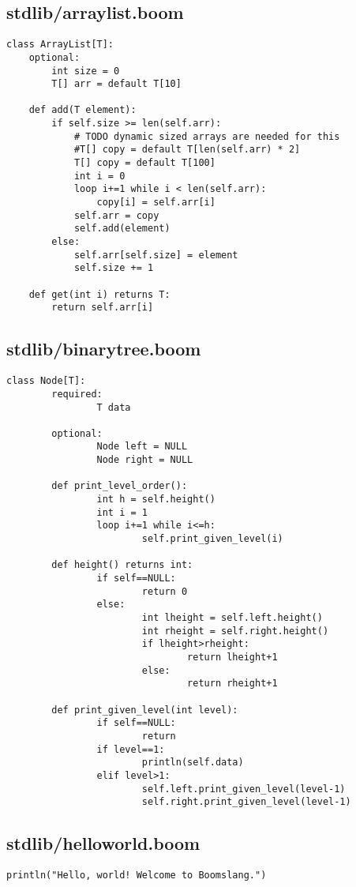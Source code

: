\documentclass{article}
\begin{document}
\subsection{stdlib/arraylist.boom} 
\begin{verbatim}
class ArrayList[T]:
	optional:
		int size = 0
		T[] arr = default T[10]

	def add(T element):
		if self.size >= len(self.arr):
			# TODO dynamic sized arrays are needed for this
			#T[] copy = default T[len(self.arr) * 2]
			T[] copy = default T[100]
			int i = 0
			loop i+=1 while i < len(self.arr):
				copy[i] = self.arr[i]
			self.arr = copy
			self.add(element)
		else:
			self.arr[self.size] = element
			self.size += 1

	def get(int i) returns T:
		return self.arr[i]
\end{verbatim}




\subsection{stdlib/binarytree.boom} 
\begin{verbatim}
class Node[T]:
        required:
                T data

        optional:
                Node left = NULL
                Node right = NULL

        def print_level_order():
                int h = self.height()
                int i = 1
                loop i+=1 while i<=h:
                        self.print_given_level(i)

        def height() returns int:
                if self==NULL:
                        return 0
                else:
                        int lheight = self.left.height()
                        int rheight = self.right.height()
                        if lheight>rheight:
                                return lheight+1
                        else:
                                return rheight+1

        def print_given_level(int level):
                if self==NULL:
                        return
                if level==1:
                        println(self.data)
                elif level>1:
                        self.left.print_given_level(level-1)
                        self.right.print_given_level(level-1)
\end{verbatim}




\subsection{stdlib/helloworld.boom} 
\begin{verbatim}
println("Hello, world! Welcome to Boomslang.")
\end{verbatim}
\end{document}
